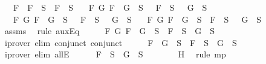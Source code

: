 \begin{isabellebody}
\ \ {\isasymand}\ {\isacharparenleft}{\isasymforall}F{\isachardot}\ \isactrlbold {\isasymnot}\ {\isacharparenleft}\isactrlbold {\isasymnot}F{\isacharparenright}\ {\isasymin}\ S\ {\isasymlongrightarrow}\ F\ {\isasymin}\ S{\isacharparenright}\isanewline
\ \ {\isasymand}\ {\isacharparenleft}{\isasymforall}F\ G{\isachardot}\ \isactrlbold {\isasymnot}{\isacharparenleft}F\ \isactrlbold {\isasymand}\ G{\isacharparenright}\ {\isasymin}\ S\ {\isasymlongrightarrow}\ \isactrlbold {\isasymnot}\ F\ {\isasymin}\ S\ {\isasymor}\ \isactrlbold {\isasymnot}\ G\ {\isasymin}\ S{\isacharparenright}\isanewline
\ \ {\isasymand}\ {\isacharparenleft}{\isasymforall}F\ G{\isachardot}\ \isactrlbold {\isasymnot}{\isacharparenleft}F\ \isactrlbold {\isasymor}\ G{\isacharparenright}\ {\isasymin}\ S\ {\isasymlongrightarrow}\ \isactrlbold {\isasymnot}\ F\ {\isasymin}\ S\ {\isasymand}\ \isactrlbold {\isasymnot}\ G\ {\isasymin}\ S{\isacharparenright}\isanewline
\ \ {\isasymand}\ {\isacharparenleft}{\isasymforall}F\ G{\isachardot}\ \isactrlbold {\isasymnot}{\isacharparenleft}F\ \isactrlbold {\isasymrightarrow}\ G{\isacharparenright}\ {\isasymin}\ S\ {\isasymlongrightarrow}\ F\ {\isasymin}\ S\ {\isasymand}\ \isactrlbold {\isasymnot}\ G\ {\isasymin}\ S{\isacharparenright}{\isachardoublequoteclose}\isanewline
\ \ \ \isamarkupfalse%
\ assms\ \isamarkupfalse%
\ {\isacharparenleft}rule\ auxEq{\isacharparenright}\isanewline
\ \ \isamarkupfalse%
\ \isamarkupfalse%
\ {\isachardoublequoteopen}{\isasymforall}F\ G{\isachardot}\ F\ \isactrlbold {\isasymor}\ G\ {\isasymin}\ S\ {\isasymlongrightarrow}\ F\ {\isasymin}\ S\ {\isasymor}\ G\ {\isasymin}\ S{\isachardoublequoteclose}\ \isanewline
\ \ \ \ \isamarkupfalse%
\ {\isacharparenleft}iprover\ elim{\isacharcolon}\ conjunct{}\ conjunct{}{\isacharparenright}\isanewline
\ \ \isamarkupfalse%
\ \isamarkupfalse%
\ {\isachardoublequoteopen}F\ \isactrlbold {\isasymor}\ G\ {\isasymin}\ S\ {\isasymlongrightarrow}\ F\ {\isasymin}\ S\ {\isasymor}\ G\ {\isasymin}\ S{\isachardoublequoteclose}\isanewline
\ \ \ \ \isamarkupfalse%
\ {\isacharparenleft}iprover\ elim{\isacharcolon}\ allE{\isacharparenright}\isanewline
\ \ \ \ \isamarkupfalse%
\ {\isachardoublequoteopen}F\ {\isasymin}\ S\ {\isasymor}\ G\ {\isasymin}\ S{\isachardoublequoteclose}\isanewline
\ \ \ \ \ \ \isamarkupfalse%
\ H\ \isamarkupfalse%
\ {\isacharparenleft}rule\ mp{\isacharparenright}\isanewline
\ \ \isamarkupfalse%

\end{isabellebody}
